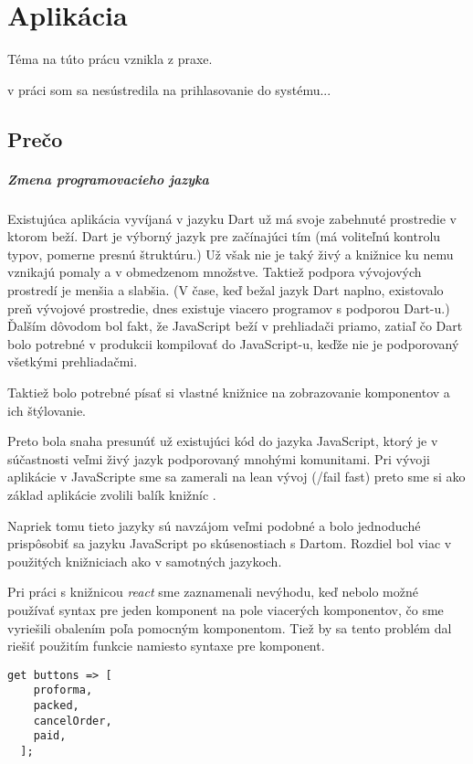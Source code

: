 \chapter{Aplikácia}
Téma na túto prácu vznikla z praxe. 

\TODO{} v práci som sa nesústredila na prihlasovanie do systému...

\section{Prečo}

\paragraph{Zmena programovacieho jazyka}
Existujúca aplikácia vyvíjaná v jazyku Dart už má svoje zabehnuté prostredie v ktorom beží. Dart je výborný jazyk pre začínajúci tím (má voliteľnú kontrolu typov, pomerne presnú štruktúru.) Už však nie je taký živý a knižnice ku nemu vznikajú pomaly a v obmedzenom množstve. 
Taktiež podpora vývojových prostredí je menšia a slabšia. (V čase, keď bežal jazyk Dart naplno, existovalo preň vývojové prostredie, dnes existuje viacero programov s podporou Dart-u.) 
Ďalším dôvodom bol fakt, že JavaScript beží v prehliadači priamo, zatiaľ čo Dart bolo potrebné v produkcii kompilovať do JavaScript-u, keďže nie je podporovaný všetkými prehliadačmi.

Taktiež bolo potrebné písať si vlastné knižnice na zobrazovanie komponentov a ich štýlovanie.

Preto bola snaha presunúť už existujúci kód do jazyka JavaScript, ktorý je v súčastnosti veľmi živý jazyk podporovaný mnohými komunitami. Pri vývoji aplikácie v JavaScripte sme sa zamerali na lean vývoj (/fail fast) preto sme si ako základ aplikácie zvolili balík knižníc \cite[este]{Este}.

Napriek tomu tieto jazyky sú navzájom veľmi podobné a bolo jednoduché prispôsobiť sa jazyku JavaScript po skúsenostiach s Dartom.
Rozdiel bol viac v použitých knižniciach ako v samotných jazykoch.

Pri práci s knižnicou \emph{react} sme zaznamenali nevýhodu, keď nebolo možné používať syntax pre jeden komponent na pole viacerých komponentov, čo sme vyriešili obalením poľa pomocným komponentom. Tiež by sa tento problém dal riešiť použitím funkcie namiesto syntaxe pre komponent.

\begin{lstlisting}[caption=Pole komponentov v Darte]
  get buttons => [
    proforma,
    packed,
    cancelOrder,
    paid,
  ];
\end{lstlisting}

